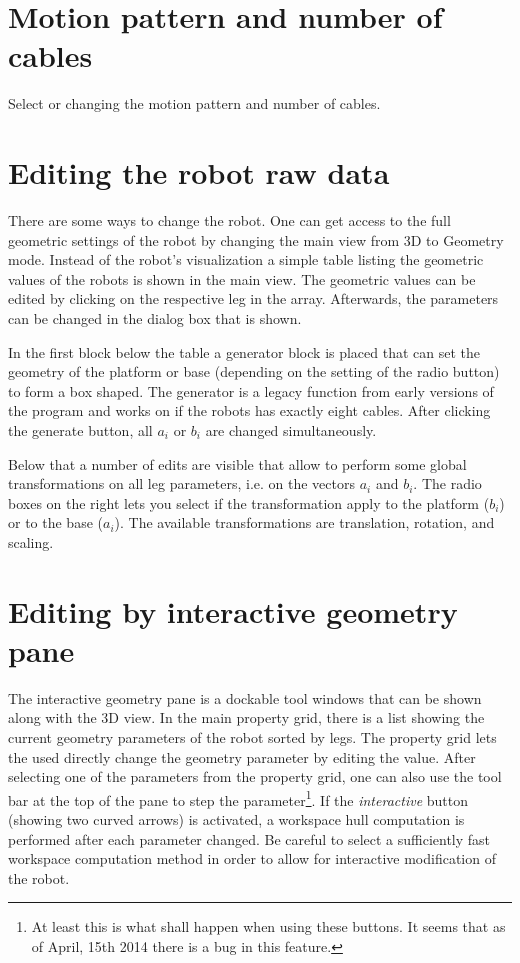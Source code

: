 \documentclass[11pt,a4paper,onepage,openany]{book}
\begin{document}
\section{Motion pattern and number of cables}
Select or changing the motion pattern and number of cables.

\section{Editing the robot raw data}
There are some ways to change the robot. One can get access to the full
geometric settings of the robot by changing the main view from 3D to Geometry
mode. Instead of the robot's visualization a simple table listing the geometric
values of the robots is shown in the main view. The geometric values can be
edited by clicking on the respective leg in the array. Afterwards, the
parameters can be changed in the dialog box that is shown.

In the first block below the table a generator block is placed that can set the
geometry of the platform or base (depending on the setting of the radio button)
to form a box shaped. The generator is a legacy function from early versions of
the program and works on if the robots has exactly eight cables. After clicking
the generate button, all $a_i$ or $b_i$ are changed simultaneously.

Below that a number of edits are visible that allow to perform some global
transformations on all leg parameters, i.e. on the vectors $a_i$ and $b_i$. The
radio boxes on the right lets you select if the transformation apply to the
platform ($b_i$) or to the base ($a_i$). The available transformations are
translation, rotation, and scaling.

\section{Editing by interactive geometry pane}
The interactive geometry pane is a dockable tool windows that can be shown
along with the 3D view. In the main property grid, there is a list showing the
current geometry parameters of the robot sorted by legs. The property grid lets
the used directly change the geometry parameter by editing the value. After
selecting one of the parameters from the property grid, one can also use the
tool bar at the top of the pane to step the parameter\footnote{At least this is
what shall happen when using these buttons. It seems that as of April, 15th
2014 there is a bug in this feature.}. If the \emph{interactive} button
(showing two curved arrows) is activated, a workspace hull computation is
performed after each parameter changed. Be careful to select a sufficiently
fast workspace computation method in order to allow for interactive
modification of the robot.
\end{document}
